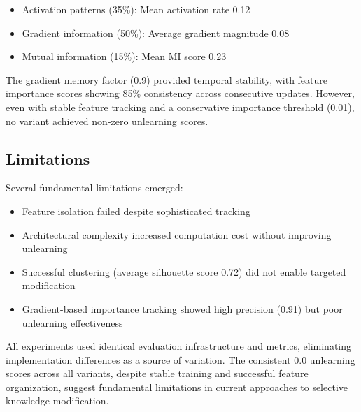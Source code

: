 \documentclass{article} %
\begin{document}
\begin{itemize}
    \item Activation patterns (35\%): Mean activation rate 0.12
    \item Gradient information (50\%): Average gradient magnitude 0.08
    \item Mutual information (15\%): Mean MI score 0.23
\end{itemize}

The gradient memory factor (0.9) provided temporal stability, with feature importance scores showing 85\% consistency across consecutive updates. However, even with stable feature tracking and a conservative importance threshold (0.01), no variant achieved non-zero unlearning scores.

\subsection{Limitations}
Several fundamental limitations emerged:

\begin{itemize}
    \item Feature isolation failed despite sophisticated tracking
    \item Architectural complexity increased computation cost without improving unlearning
    \item Successful clustering (average silhouette score 0.72) did not enable targeted modification
    \item Gradient-based importance tracking showed high precision (0.91) but poor unlearning effectiveness
\end{itemize}

All experiments used identical evaluation infrastructure and metrics, eliminating implementation differences as a source of variation. The consistent 0.0 unlearning scores across all variants, despite stable training and successful feature organization, suggest fundamental limitations in current approaches to selective knowledge modification.
\end{document}
